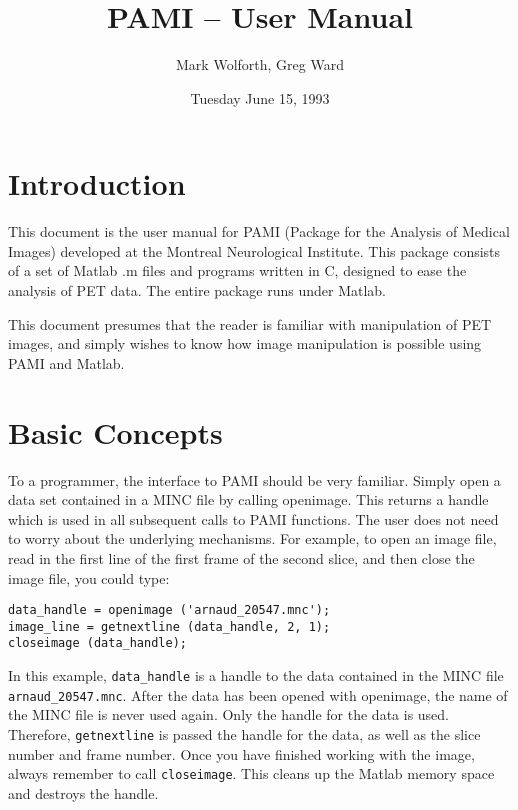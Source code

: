
\title{PAMI -- User Manual}
\author{Mark Wolforth, Greg Ward}
\date{Tuesday June 15, 1993}  

\def\code#1{{\tt #1}}

 

\maketitle
\newpage

\tableofcontents

\newpage
\section{Introduction}

This document is the user manual for PAMI (Package for the Analysis of Medical
Images) developed at the Montreal Neurological Institute.  This package consists
of a set of Matlab .m files and programs written in C, designed to ease the
analysis of PET data.  The entire package runs under Matlab.

This document presumes that the reader is familiar with manipulation of PET
images, and simply wishes to know how image manipulation is possible using
PAMI and Matlab.


\newpage
\section{Basic Concepts}

To a programmer, the interface to PAMI should be very familiar.  Simply open
a data set contained in a MINC file by calling openimage.  This returns a
handle which is used in all subsequent calls to PAMI functions.  The user does
not need to worry about the underlying mechanisms.  For example, to open
an image file, read in the first line of the first frame of the second slice,
and then close the image file, you could type:


\begin{verbatim}
data_handle = openimage ('arnaud_20547.mnc');
image_line = getnextline (data_handle, 2, 1);
closeimage (data_handle);
\end{verbatim}


In this example, \verb+data_handle+ is a handle to the data contained in the
MINC file \verb+arnaud_20547.mnc+.  After the data has been opened with
openimage, the name of the MINC file is never used again.  Only the handle for
the data is used.  Therefore, \verb+getnextline+ is passed the handle for the
data, as well as the slice number and frame number.  Once you have finished
working with the image, always remember to call \verb+closeimage+.  This
cleans up the Matlab memory space and destroys the handle.

